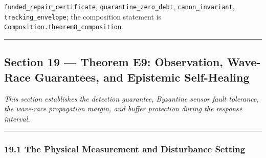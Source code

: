 \documentclass[
]{article}
\begin{document}
\texttt{f\allowbreak{}u\allowbreak{}n\allowbreak{}d\allowbreak{}e\allowbreak{}d\allowbreak{}\_\allowbreak{}r\allowbreak{}e\allowbreak{}p\allowbreak{}a\allowbreak{}i\allowbreak{}r\allowbreak{}\_\allowbreak{}c\allowbreak{}e\allowbreak{}r\allowbreak{}t\allowbreak{}i\allowbreak{}f\allowbreak{}i\allowbreak{}c\allowbreak{}a\allowbreak{}t\allowbreak{}e},
\texttt{q\allowbreak{}u\allowbreak{}a\allowbreak{}r\allowbreak{}a\allowbreak{}n\allowbreak{}t\allowbreak{}i\allowbreak{}n\allowbreak{}e\allowbreak{}\_\allowbreak{}z\allowbreak{}e\allowbreak{}r\allowbreak{}o\allowbreak{}\_\allowbreak{}d\allowbreak{}e\allowbreak{}b\allowbreak{}t},
\texttt{canon\_invariant},
\texttt{t\allowbreak{}r\allowbreak{}a\allowbreak{}c\allowbreak{}k\allowbreak{}i\allowbreak{}n\allowbreak{}g\allowbreak{}\_\allowbreak{}e\allowbreak{}n\allowbreak{}v\allowbreak{}e\allowbreak{}l\allowbreak{}o\allowbreak{}p\allowbreak{}e};
the composition statement is
\texttt{C\allowbreak{}o\allowbreak{}m\allowbreak{}p\allowbreak{}o\allowbreak{}s\allowbreak{}i\allowbreak{}t\allowbreak{}i\allowbreak{}o\allowbreak{}n\allowbreak{}.\allowbreak{}t\allowbreak{}h\allowbreak{}e\allowbreak{}o\allowbreak{}r\allowbreak{}e\allowbreak{}m\allowbreak{}8\allowbreak{}\_\allowbreak{}c\allowbreak{}o\allowbreak{}m\allowbreak{}p\allowbreak{}o\allowbreak{}s\allowbreak{}i\allowbreak{}t\allowbreak{}i\allowbreak{}o\allowbreak{}n}.

\begin{center}\rule{0.5\linewidth}{0.5pt}\end{center}

\subsection{Section 19 --- Theorem E9: Observation, Wave-Race
Guarantees, and Epistemic
Self-Healing}\label{section-19-theorem-e9-observation-wave-race-guarantees-and-epistemic-self-healing}

\emph{This section establishes the detection guarantee, Byzantine sensor
fault tolerance, the wave-race propagation margin, and buffer protection
during the response interval.}

\begin{center}\rule{0.5\linewidth}{0.5pt}\end{center}

\subsubsection{19.1 The Physical Measurement and Disturbance
Setting}\label{the-physical-measurement-and-disturbance-setting}
\end{document}
